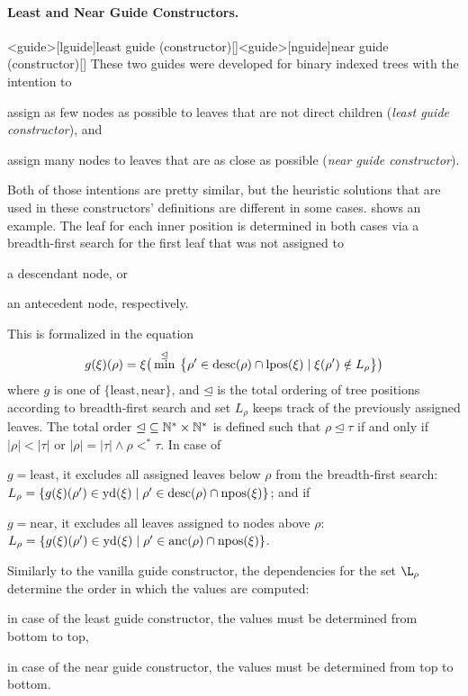 \documentclass[../../document.tex]{subfiles}
\begin{document}
    \paragraph{Least and Near Guide Constructors.}<guide>[lguide]{least guide (constructor)}[]<guide>[nguide]{near guide (constructor)}[]
    These two guides were developed for binary indexed trees with the intention to
    \begin{inparaenum}
        \item assign as few nodes as possible to leaves that are not direct children (\emph{least guide constructor}), and
        \item assign many nodes to leaves that are as close as possible (\emph{near guide constructor}).
    \end{inparaenum}
    Both of those intentions are pretty similar, but the heuristic solutions that are used in these constructors' definitions are different in some cases.
     shows an example.
    The leaf for each inner position is determined in both cases via a breadth-first search for the first leaf that was not assigned to
    \begin{inparaenum}
        \item a descendant node, or
        \item an antecedent node, respectively.
    \end{inparaenum}
    This is formalized in the equation
    \[
    g(\xi)(\rho) = \xi\big( \min^{\unlhd} \: \big\{\rho' \in \operatorname{desc}(\rho) \cap \operatorname{lpos}(\xi) \mid \xi(\rho') \notin L_\rho \big\} \big)
    \]
    where \(g\) is one of \(\{\mathrm{least}, \mathrm{near}\}\), and \(\unlhd\) is the total ordering of tree positions according to breadth-first search and set \(L_\rho\) keeps track of the previously assigned leaves.
    The total order \(\unlhd \subseteq \mathbb{N}^* \times \mathbb{N}^*\) is defined such that \(\rho \unlhd \tau\) if and only if \(|\rho| < |\tau|\) or \(|\rho| = |\tau| \land \rho <^* \tau\).
    In case of
    \begin{inparaenum}
        \item \(g = \mathrm{least}\), it excludes all assigned leaves below \(\rho\) from the breadth-first search:
        \(L_\rho = \{ g(\xi)(\rho') \in \operatorname{yd}(\xi) \mid \rho' \in \operatorname{desc}(\rho) \cap \operatorname{npos}(\xi) \}\); and if
        \item \(g = \mathrm{near}\), it excludes all leaves assigned to nodes above \(\rho\):
        \(L_\rho = \{ g(\xi)(\rho') \in \operatorname{yd}(\xi) \mid \rho' \in \operatorname{anc}(\rho) \cap \operatorname{npos}(\xi) \}\).
    \end{inparaenum}
    Similarly to the vanilla guide constructor, the dependencies for the set \(\L_\rho\) determine the order in which the values are computed:
    \begin{inparaenum}
        \item in case of the least guide constructor, the values must be determined from bottom to top,
        \item in case of the near guide constructor, the values must be determined from top to bottom.
    \end{inparaenum}
\end{document}
